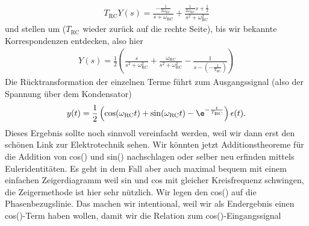 \begin{Loesung}
\begin{itemize}
\begin{align}
T_\mathrm{RC} Y(s) = \frac{-\frac{1}{2\omega_\mathrm{RC}}}{s+\omega_\mathrm{RC}} + \frac{\frac{1}{2\omega_\mathrm{RC}} s + \frac{1}{2}}{s^2+\omega_\mathrm{RC}^2}
\end{align}
und stellen um ($T_\mathrm{RC}$ wieder zurück auf die rechte Seite),
bis wir bekannte Korrespondenzen entdecken, also hier
\begin{align}
Y(s) = \frac{1}{2} \left(
\frac{s}{s^2+\omega_\mathrm{RC}^2} + \frac{\omega_\mathrm{RC}}{s^2+\omega_\mathrm{RC}^2} - \frac{1}{s-(-\frac{1}{T_\mathrm{RC}})}
\right)
\end{align}
%
Die Rücktransformation der einzelnen Terme führt zum Ausgangssignal (also der
Spannung über dem Kondensator)
\begin{align}
  y(t) = \frac{1}{2}\left(
  \cos(\omega_\mathrm{RC} t) + \sin(\omega_\mathrm{RC} t) - \e^{-\frac{t}{T_\mathrm{RC}}}
  \right) \epsilon(t).
\end{align}
Dieses Ergebnis sollte noch sinnvoll vereinfacht werden, weil wir dann erst
den schönen Link zur Elektrotechnik sehen.
%
Wir könnten jetzt Additionstheoreme für die Addition von cos() und sin() nachschlagen
oder selber neu erfinden mittels Euleridentitäten.
%
Es geht in dem Fall aber auch maximal bequem mit einem einfachen Zeigerdiagramm
weil sin und cos mit gleicher Kreisfrequenz schwingen, die Zeigermethode ist hier
sehr nützlich. Wir legen den cos() auf die Phasenbezugslinie.
Das machen wir intentional, weil wir als Endergebnis
einen cos()-Term haben wollen, damit wir die Relation zum cos()-Eingangssignal

\end{itemize}
\end{Loesung}
